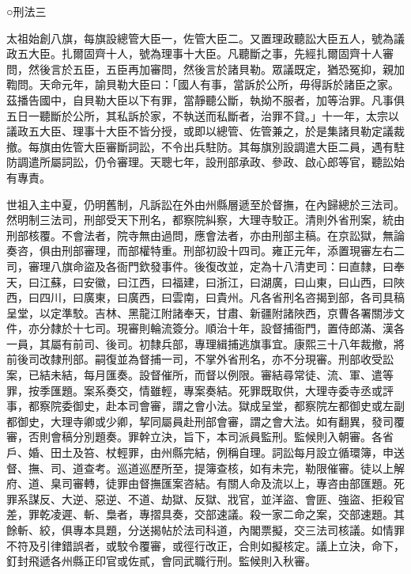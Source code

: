 
\begin{pinyinscope}
○刑法三

太祖始創八旗，每旗設總管大臣一，佐管大臣二。又置理政聽訟大臣五人，號為議政五大臣。扎爾固齊十人，號為理事十大臣。凡聽斷之事，先經扎爾固齊十人審問，然後言於五臣，五臣再加審問，然後言於諸貝勒。眾議既定，猶恐冤抑，親加鞫問。天命元年，諭貝勒大臣曰：「國人有事，當訴於公所，毋得訴於諸臣之家。茲播告國中，自貝勒大臣以下有罪，當靜聽公斷，執拗不服者，加等治罪。凡事俱五日一聽斷於公所，其私訴於家，不執送而私斷者，治罪不貸。」十一年，太宗以議政五大臣、理事十大臣不皆分授，或即以總管、佐管兼之，於是集諸貝勒定議裁撤。每旗由佐管大臣審斷詞訟，不令出兵駐防。其每旗別設調遣大臣二員，遇有駐防調遣所屬詞訟，仍令審理。天聰七年，設刑部承政、參政、啟心郎等官，聽訟始有專責。

世祖入主中夏，仍明舊制，凡訴訟在外由州縣層遞至於督撫，在內歸總於三法司。然明制三法司，刑部受天下刑名，都察院糾察，大理寺駮正。清則外省刑案，統由刑部核覆。不會法者，院寺無由過問，應會法者，亦由刑部主稿。在京訟獄，無論奏咨，俱由刑部審理，而部權特重。刑部初設十四司。雍正元年，添置現審左右二司，審理八旗命盜及各衙門欽發事件。後復改並，定為十八清吏司：曰直隸，曰奉天，曰江蘇，曰安徽，曰江西，曰福建，曰浙江，曰湖廣，曰山東，曰山西，曰陜西，曰四川，曰廣東，曰廣西，曰雲南，曰貴州。凡各省刑名咨揭到部，各司具稿呈堂，以定準駮。吉林、黑龍江附諸奉天，甘肅、新疆附諸陜西，京曹各署關涉文件，亦分隸於十七司。現審則輪流簽分。順治十年，設督捕衙門，置侍郎滿、漢各一員，其屬有前司、後司。初隸兵部，專理緝捕逃旗事宜。康熙三十八年裁撤，將前後司改隸刑部。嗣復並為督捕一司，不掌外省刑名，亦不分現審。刑部收受訟案，已結未結，每月匯奏。設督催所，而督以例限。審結尋常徒、流、軍、遣等罪，按季匯題。案系奏交，情雖輕，專案奏結。死罪既取供，大理寺委寺丞或評事，都察院委御史，赴本司會審，謂之會小法。獄成呈堂，都察院左都御史或左副都御史，大理寺卿或少卿，挈同屬員赴刑部會審，謂之會大法。如有翻異，發司覆審，否則會稿分別題奏。罪幹立決，旨下，本司派員監刑。監候則入朝審。各省戶、婚、田土及笞、杖輕罪，由州縣完結，例稱自理。詞訟每月設立循環簿，申送督、撫、司、道查考。巡道巡歷所至，提簿查核，如有未完，勒限催審。徒以上解府、道、臬司審轉，徒罪由督撫匯案咨結。有關人命及流以上，專咨由部匯題。死罪系謀反、大逆、惡逆、不道、劫獄、反獄、戕官，並洋盜、會匪、強盜、拒殺官差，罪乾凌遲、斬、梟者，專摺具奏，交部速議。殺一家二命之案，交部速題。其餘斬、絞，俱專本具題，分送揭帖於法司科道，內閣票擬，交三法司核議。如情罪不符及引律錯誤者，或駮令覆審，或徑行改正，合則如擬核定。議上立決，命下，釘封飛遞各州縣正印官或佐貳，會同武職行刑。監候則入秋審。


\end{pinyinscope}
